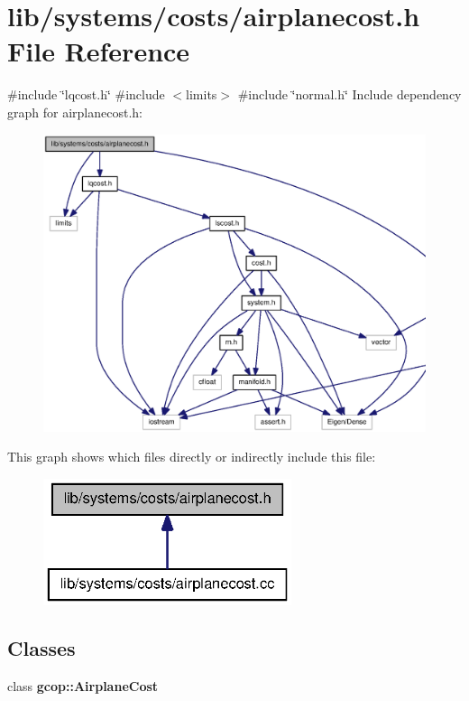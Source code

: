 \section{lib/systems/costs/airplanecost.h \-File \-Reference}
\label{airplanecost_8h}
{\ttfamily \#include \char`\"{}lqcost.\-h\char`\"{}}\*
{\ttfamily \#include $<$limits$>$}\*
{\ttfamily \#include \char`\"{}normal.\-h\char`\"{}}\*
\-Include dependency graph for airplanecost.\-h\-:
\nopagebreak
\begin{figure}[H]
\begin{center}
\leavevmode
\includegraphics[width=350pt]{airplanecost_8h__incl}
\end{center}
\end{figure}
\-This graph shows which files directly or indirectly include this file\-:
\nopagebreak
\begin{figure}[H]
\begin{center}
\leavevmode
\includegraphics[width=206pt]{airplanecost_8h__dep__incl}
\end{center}
\end{figure}
\subsection*{\-Classes}
\begin{DoxyCompactItemize}
\item 
class {\bf gcop\-::\-Airplane\-Cost}
\end{DoxyCompactItemize}
